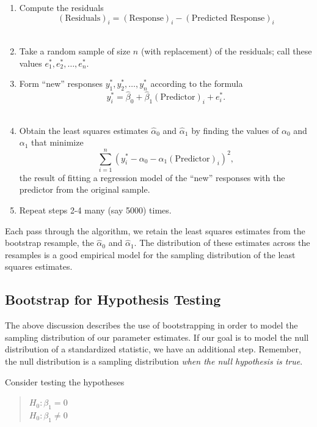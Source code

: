 \documentclass[
  letterpaper,
  DIV=11,
  numbers=noendperiod]{scrreprt}
\providecommand{\tightlist}{%
  \setlength{\itemsep}{0pt}\setlength{\parskip}{0pt}}\usepackage{longtable,booktabs,array}
\theoremstyle{plain}
\theoremstyle{definition}
\theoremstyle{definition}
\theoremstyle{remark}
\begin{document}
\begin{enumerate}
\def\labelenumi{\arabic{enumi}.}
\tightlist
\item
  Compute the residuals
  \[(\text{Residuals})_i = (\text{Response})_i - (\text{Predicted Response})_i\]\\
\item
  Take a random sample of size \(n\) (with replacement) of the
  residuals; call these values \(e_1^*, e_2^*,  \dotsc, e_n^*\).\\
\item
  Form ``new'' responses \(y_1^*, y_2^*, \dotsc, y_n^*\) according to
  the formula
  \[y_i^* = \widehat{\beta}_0 + \widehat{\beta}_1 (\text{Predictor})_i + e_i^*.\]\\
\item
  Obtain the least squares estimates \(\widehat{\alpha}_0\) and
  \(\widehat{\alpha}_1\) by finding the values of \(\alpha_0\) and
  \(\alpha_1\) that minimize
  \[\sum_{i=1}^{n} \left(y_i^* - \alpha_0 - \alpha_1 (\text{Predictor})_i\right)^2,\]
  the result of fitting a regression model of the ``new'' responses with
  the predictor from the original sample.\\
\item
  Repeat steps 2-4 many (say 5000) times.
\end{enumerate}

Each pass through the algorithm, we retain the least squares estimates
from the bootstrap resample, the \(\widehat{\alpha}_0\) and
\(\widehat{\alpha}_1\). The distribution of these estimates across the
resamples is a good empirical model for the sampling distribution of the
least squares estimates.

\subsection{Bootstrap for Hypothesis
Testing}\label{bootstrap-for-hypothesis-testing}

The above discussion describes the use of bootstrapping in order to
model the sampling distribution of our parameter estimates. If our goal
is to model the null distribution of a standardized statistic, we have
an additional step. Remember, the null distribution is a sampling
distribution \emph{when the null hypothesis is true}.

Consider testing the hypotheses

\begin{quote}
\(H_0: \beta_1 = 0\)\\
\(H_0: \beta_1 \neq 0\)
\end{quote}
\end{document}
